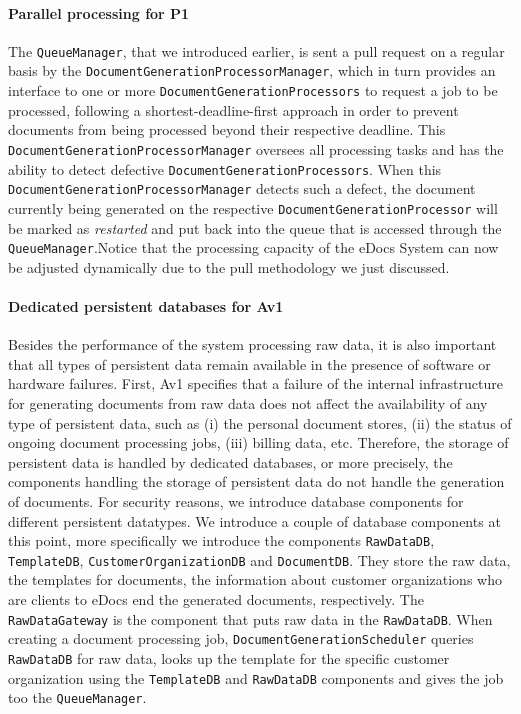 \documentclass[a4paper,10pt]{article}
\begin{document}
\paragraph{Parallel processing for P1}
The \texttt{QueueManager}, that we introduced earlier, is sent a pull request on a regular basis by the \texttt{DocumentGenerationProcessorManager}, which in turn provides an interface to one or more \texttt{DocumentGenerationProcessors} to request a job to be processed, following a shortest-deadline-first approach in order to prevent documents from being processed beyond their respective deadline. This \texttt{DocumentGenerationProcessorManager} oversees all processing tasks and has the ability to detect defective \texttt{DocumentGenerationProcessors}. When this \texttt{DocumentGenerationProcessorManager} detects such a defect, the document currently being generated on the respective \texttt{DocumentGenerationProcessor} will be marked as \textit{restarted} and put back into the queue that is accessed through the \texttt{QueueManager}.Notice that the processing capacity of the eDocs System can now be adjusted dynamically due to the pull methodology we just discussed.

\paragraph{Dedicated persistent databases for Av1}
Besides the performance of the system processing raw data, it is also important that all types of persistent data remain available in the presence of software or hardware failures.
First, Av1 specifies that a failure of the internal infrastructure for generating documents from raw data does not affect the availability of any type of persistent data, such as (i) the personal document stores, (ii) the status of ongoing document processing jobs, (iii) billing data, etc. Therefore, the storage of persistent data is handled by dedicated databases, or more precisely, the components handling the storage of persistent data do not handle the generation of documents. For security reasons, we introduce database components for different persistent datatypes. We introduce   a couple of database components at this point, more specifically we introduce the components \texttt{RawDataDB}, \texttt{TemplateDB}, \texttt{CustomerOrganizationDB} and \texttt{DocumentDB}. They store the raw data, the templates for documents, the information about customer organizations who are clients to eDocs end the generated documents, respectively. The \texttt{RawDataGateway} is the component that puts raw data in the \texttt{RawDataDB}. When creating a document processing job,  \texttt{DocumentGenerationScheduler} queries \texttt{RawDataDB} for raw data, looks up the template for the specific  customer organization using the \texttt{TemplateDB} and \texttt{RawDataDB} components and gives the job too the \texttt{QueueManager}.
\end{document}

